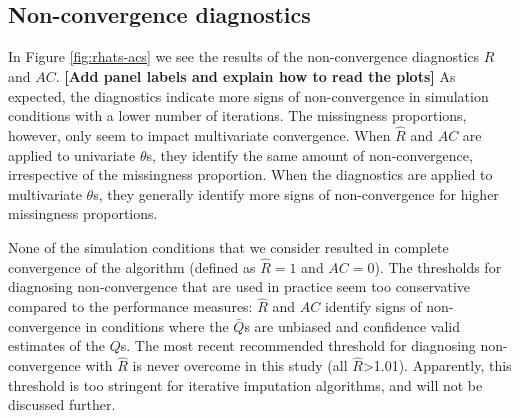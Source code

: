 \documentclass[Royal,times,sageh]{sagej}
\begin{document}
\hypertarget{non-convergence-diagnostics}{%
\subsection{Non-convergence diagnostics}\label{non-convergence-diagnostics}}

In Figure \ref{fig:rhats-acs} we see the results of the non-convergence diagnostics \(\widehat{R}\) and \(AC\). \textbf{{[}Add panel labels and explain how to read the plots{]}} As expected, the diagnostics indicate more signs of non-convergence in simulation conditions with a lower number of iterations. The missingness proportions, however, only seem to impact multivariate convergence. When \(\widehat{R}\) and \(AC\) are applied to univariate \(\theta\)s, they identify the same amount of non-convergence, irrespective of the missingness proportion. When the diagnostics are applied to multivariate \(\theta\)s, they generally identify more signs of non-convergence for higher missingness proportions.

None of the simulation conditions that we consider resulted in complete convergence of the algorithm (defined as \(\widehat{R}=1\) and \(AC=0\)). The thresholds for diagnosing non-convergence that are used in practice seem too conservative compared to the performance measures: \(\widehat{R}\) and \(AC\) identify signs of non-convergence in conditions where the \(\bar{Q}\)s are unbiased and confidence valid estimates of the \(Q\)s. The most recent recommended threshold for diagnosing non-convergence with \(\widehat{R}\) is never overcome in this study (all \(\widehat{R}\)\textgreater1.01). Apparently, this threshold is too stringent for iterative imputation algorithms, and will not be discussed further.
\end{document}
